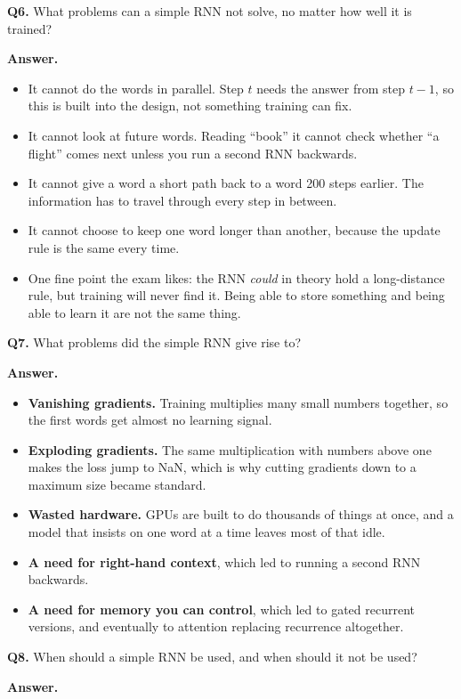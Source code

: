 \documentclass[11pt]{article}
\begin{document}
\medskip
\textbf{Q6.} What problems can a simple RNN not solve, no matter how well it is trained?

\textbf{Answer.}
\begin{itemize}
  \item It cannot do the words in parallel. Step $t$ needs the answer from step $t-1$, so this is built into the design, not something training can fix.
  \item It cannot look at future words. Reading ``book'' it cannot check whether ``a flight'' comes next unless you run a second RNN backwards.
  \item It cannot give a word a short path back to a word 200 steps earlier. The information has to travel through every step in between.
  \item It cannot choose to keep one word longer than another, because the update rule is the same every time.
  \item One fine point the exam likes: the RNN \emph{could} in theory hold a long-distance rule, but training will never find it. Being able to store something and being able to learn it are not the same thing.
\end{itemize}

\medskip
\textbf{Q7.} What problems did the simple RNN give rise to?

\textbf{Answer.}
\begin{itemize}
  \item \textbf{Vanishing gradients.} Training multiplies many small numbers together, so the first words get almost no learning signal.
  \item \textbf{Exploding gradients.} The same multiplication with numbers above one makes the loss jump to NaN, which is why cutting gradients down to a maximum size became standard.
  \item \textbf{Wasted hardware.} GPUs are built to do thousands of things at once, and a model that insists on one word at a time leaves most of that idle.
  \item \textbf{A need for right-hand context}, which led to running a second RNN backwards.
  \item \textbf{A need for memory you can control}, which led to gated recurrent versions, and eventually to attention replacing recurrence altogether.
\end{itemize}

\medskip
\textbf{Q8.} When should a simple RNN be used, and when should it not be used?

\textbf{Answer.}
\end{document}
